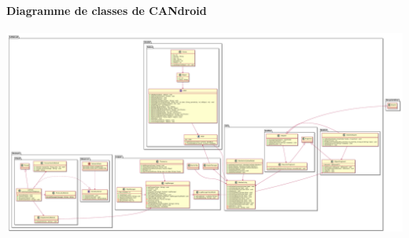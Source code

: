 \paragraph{Diagramme de classes de CANdroid}

\begin{minipage}
    {\linewidth}
    \centering
    \includegraphics[width=\linewidth]{../schemas/Conception_detaillee/diag_class_candroid.pdf}
\end{minipage}